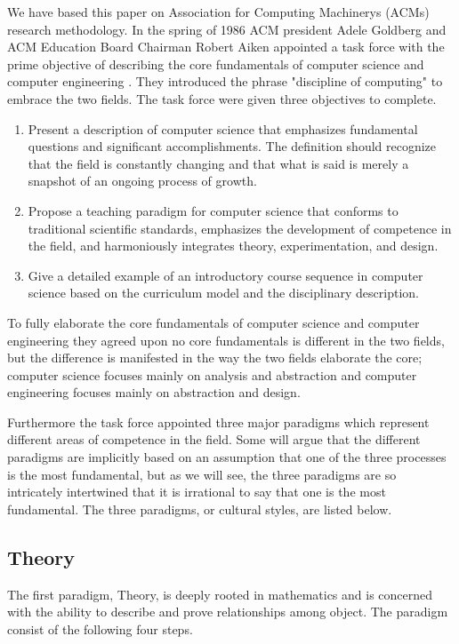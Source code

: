 \documentclass[thesis.tex]{subfiles}
\begin{document}
We have based this paper on Association for Computing Machinerys (ACMs) research
methodology. In the spring of 1986 ACM president Adele Goldberg and ACM Education Board Chairman Robert Aiken appointed a task force with the prime objective of describing the core fundamentals of computer science and computer engineering \cite{ComputingDiscipline89}. They introduced the phrase "discipline of computing" to embrace the two fields. The task force were given three objectives to complete.

\begin{enumerate}
\item Present a description of computer science that emphasizes fundamental questions and significant accomplishments. The definition should recognize that the field is constantly changing and that what is said is merely a snapshot of an ongoing process of growth.
\item Propose a teaching paradigm for computer science that conforms to traditional scientific standards, emphasizes the development of competence in the field, and harmoniously integrates theory, experimentation, and design.
\item Give a detailed example of an introductory course sequence in computer science based on the curriculum model and the disciplinary description.
\end{enumerate}

To fully elaborate the core fundamentals of computer science and computer engineering they agreed upon no core fundamentals is different in the two fields, but the difference is manifested in the way the two fields elaborate the core; computer science focuses mainly on analysis and abstraction and computer engineering focuses mainly on abstraction and design.

Furthermore the task force appointed three major paradigms which represent different areas of competence in the field. Some will argue that the different paradigms are implicitly based on an assumption that one of the three processes is the most fundamental, but as we will see, the three paradigms are so intricately intertwined that it is irrational to say that one is the most fundamental. The three paradigms, or cultural styles, are listed below.

\subsection{Theory} \label{sec:theory}
The first paradigm, Theory, is deeply rooted in mathematics and is concerned with the ability to describe and prove relationships among object. The paradigm consist of the following four steps.
\end{document}
